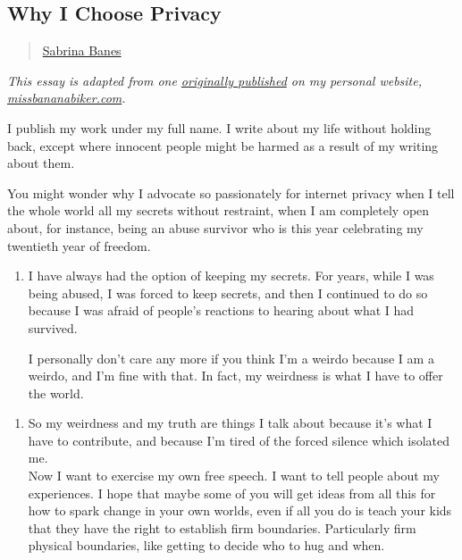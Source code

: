 \subsection{Why I Choose Privacy}\label{why-i-choose-privacy}

\begin{quote}
\hyperlink{sabrina-banes}{Sabrina Banes}
\end{quote}

\emph{This essay is adapted from one
\href{http://www.missbananabiker.com/2015/10/28/the-option-of-privacy/}{originally
published} on my personal website,
\href{http://missbananabiker.com}{missbananabiker.com}.}

I publish my work under my full name. I write about my life without
holding back, except where innocent people might be harmed as a result
of my writing about them.

You might wonder why I advocate so passionately for internet privacy
when I tell the whole world all my secrets without restraint, when I am
completely open about, for instance, being an abuse survivor who is this
year celebrating my twentieth year of freedom.

\begin{enumerate}
\def\labelenumi{\arabic{enumi}.}
\tightlist
\item
  I have always had the option of keeping my secrets. For years, while I
  was being abused, I was forced to keep secrets, and then I continued
  to do so because I was afraid of people's reactions to hearing about
  what I had survived.


  I personally don't care any more if you think I'm a weirdo because I am
  a weirdo, and I'm fine with that. In fact, my weirdness is what I have
  to offer the world.
\end{enumerate}

\begin{enumerate}
\def\labelenumi{\arabic{enumi}.}
\setcounter{enumi}{1}
\tightlist
\item
  So my weirdness and my truth are things I talk about because it's what
  I have to contribute, and because I'm tired of the forced silence
  which isolated me.\\

  Now I want to exercise my own free speech. I want to tell people about
  my experiences. I hope that maybe some of you will get ideas from all
  this for how to spark change in your own worlds, even if all you do is
  teach your kids that they have the right to establish firm boundaries.
  Particularly firm physical boundaries, like getting to decide who to hug
  and when.

\end{enumerate}

